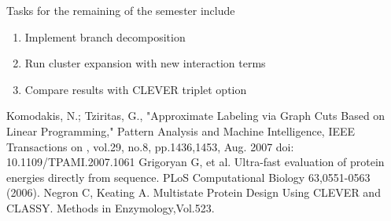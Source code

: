 \documentclass[11pt]{article}
\begin{document}
		 Tasks for the remaining of the semester include
		 \begin{enumerate}
		 \item Implement branch decomposition
		 \item Run cluster expansion with new interaction terms
		 \item Compare results with CLEVER triplet option
		 \end{enumerate}
	
	
	\begin{thebibliography}{99}
		 Komodakis, N.; Tziritas, G., "Approximate Labeling
		via Graph Cuts Based on Linear Programming," Pattern Analysis and Machine Intelligence, IEEE Transactions on , vol.29, no.8, pp.1436,1453, Aug. 2007
		doi: 10.1109/TPAMI.2007.1061	
		 Grigoryan G, et al. Ultra-fast evaluation of protein energies directly from sequence. PLoS Computational Biology 63,0551-0563 (2006).
		 Negron C, Keating A.  Multistate Protein Design Using CLEVER and CLASSY. Methods in Enzymology,Vol.523.
	\end{thebibliography}
\end{document}
